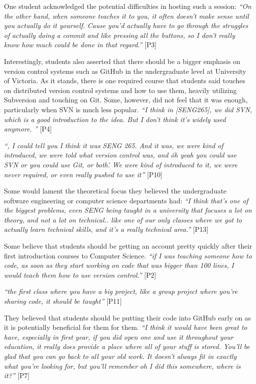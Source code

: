 One student acknowledged the potential difficulties in hosting such a session: \textit{``On the other hand, when someone teaches it to you, it often doesn't make sense until you actually do it yourself. Cause you'd actually have to go through the struggles of actually doing a commit and like pressing all the buttons, so I don't really know how much could be done in that regard.''} [P3]

Interestingly, students also asserted that there should be a bigger emphasis on version control systems such as GitHub in the undergraduate level at University of Victoria. As it stands, there is one required course that students said touches on distributed version control systems and how to use them, heavily utilizing Subversion and touching on Git. Some, however, did not feel that it was enough, particularly when SVN is much less popular. \textit{``I think in [SENG265], we did SVN, which is a good introduction to the idea. But I don't think it's widely used anymore. ''} [P4]

\textit{``, I could tell you I think it was SENG 265. And it was, we were kind of introduced, we were told what version control was, and \'oh yeah you could use SVN or you could use Git, or both\'. We were kind of introduced to it, we were never required, or even really pushed to use it''} [P10]

Some would lament the theoretical focus they believed the undergraduate software engineering or computer science departments had: \textit{``I think that's one of the biggest problems, even SENG being taught in a university that focuses a lot on theory, and not a lot on technical.. like one of our only classes where we got to actually learn technical skills, and it's a really technical area.''} [P13]

Some believe that students should be getting an account pretty quickly after their first introduction courses to Computer Science. \textit{``if I was teaching someone how to code, as soon as they start working on code that was bigger than 100 lines, I would teach them how to use version control.''} [P2]

\textit{``the first class where you have a big project, like a group project where you're sharing code, it should be taught''} [P11]

They believed that students should be putting their code into GitHub early on as it is potentially beneficial for them for them. \textit{``I think it would have been great to have, especially in first year, if you did open one and use it throughout your education, it really does provide a place where all of your stuff is stored. You'll be glad that you can go back to all your old work. It doesn't always fit in exactly what you're looking for, but you'll remember oh I did this somewhere, where is it?''} [P7]

